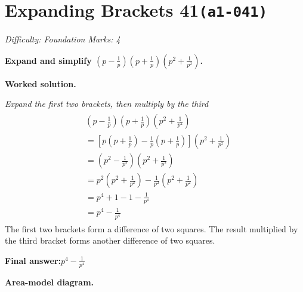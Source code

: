 \documentclass[11pt]{article}
\newcommand{\question}[1]{\par\medskip\noindent\textbf{#1}\par}
\begin{document}
\section*{Expanding Brackets 41\quad\small\texttt{(a1-041)}}
\textit{Difficulty: Foundation \quad\textbar\quad Marks: 4}

\question{Expand and simplify \( \left(p - \frac{1}{p}\right)\left(p + \frac{1}{p}\right)\left(p^2 + \frac{1}{p^2}\right) \).}

\textbf{Worked solution.}

\textit{Expand the first two brackets, then multiply by the third}
\[\begin{gathered}
\begin{aligned} &\left(p - \frac{1}{p}\right)\left(p + \frac{1}{p}\right)\left(p^2 + \frac{1}{p^2}\right) \\ &= \left[ p\left(p+\frac{1}{p}\right) - \frac{1}{p}\left(p+\frac{1}{p}\right) \right]\left(p^2 + \frac{1}{p^2}\right) \\ &= \left( p^2 - \frac{1}{p^2} \right)\left(p^2 + \frac{1}{p^2}\right) \\ &= p^2\left( p^2 + \frac{1}{p^2} \right) -\frac{1}{p^2}\left( p^2 +\frac{1}{p^2}\right) \\ &= p^4 + 1 - 1 - \frac{1}{p^4} \\ &= p^4 - \frac{1}{p^4} \end{aligned}
\end{gathered}\]
The first two brackets form a difference of two squares. The result multiplied by the third bracket forms another difference of two squares.

\begin{answerbox}
\textbf{Final answer:}\quad \(\displaystyle p^4 - \frac{1}{p^4}\)
\end{answerbox}
\textbf{Area-model diagram.}
\end{document}
